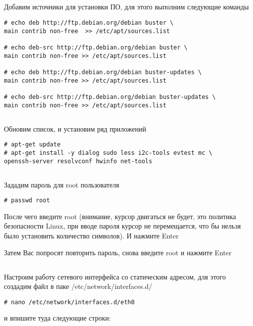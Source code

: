 \subsection{}Добавим источники для установки ПО, для этого выполним следующие команды 
\begin{lstlisting}[style=bash]
# echo deb http://ftp.debian.org/debian buster \
main contrib non-free  >> /etc/apt/sources.list

# echo deb-src http://ftp.debian.org/debian buster \
main contrib non-free >> /etc/apt/sources.list

# echo deb http://ftp.debian.org/debian buster-updates \
main contrib non-free >> /etc/apt/sources.list

# echo deb-src http://ftp.debian.org/debian buster-updates \
main contrib non-free >> /etc/apt/sources.list
\end{lstlisting}

\subsection{} Обновим список, и установим ряд приложений
\begin{lstlisting}[style=bash]
# apt-get update
# apt-get install -y dialog sudo less i2c-tools evtest mc \
openssh-server resolvconf hwinfo net-tools
\end{lstlisting}

\subsection{}Зададим пароль для root пользователя
\begin{lstlisting}[style=bash]
# passwd root
\end{lstlisting}
После чего введите root (внимание, курсор двигаться не будет, это политика безопасности Linux, при вводе пароля курсор не перемещается, что бы нельзя было установить количество символов). И нажмите Enter

Затем Вас попросят повторить пароль, снова введите root и нажмите Enter

\subsection{}Настроим работу сетевого интерфейса со статическим адресом, для этого создадим файл в паке /etc/network/interfaces.d/

\begin{lstlisting}[style=bash]
# nano /etc/network/interfaces.d/eth0
\end{lstlisting}
и впишите туда следующие строки:


